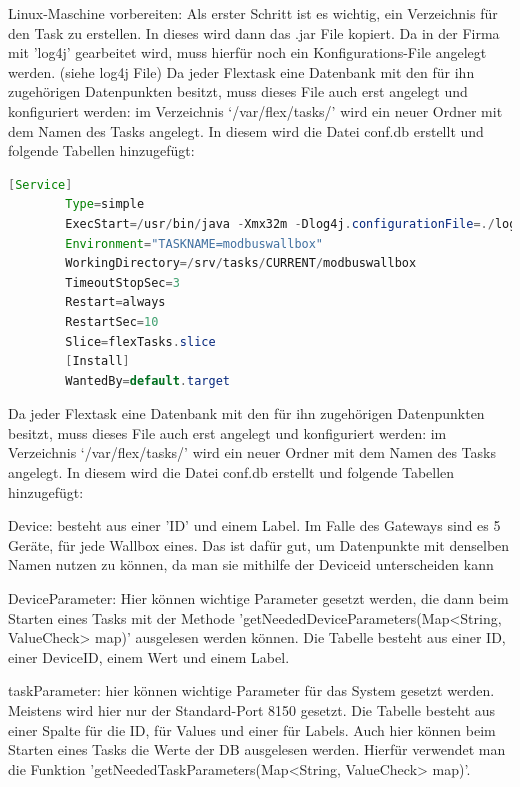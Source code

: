 \begin{compactenum}
    \item Linux-Maschine vorbereiten: Als erster Schritt ist es wichtig, ein Verzeichnis für den Task zu erstellen. In dieses wird dann das .jar File kopiert. Da in der Firma mit 'log4j' gearbeitet wird, muss hierfür noch ein Konfigurations-File angelegt werden. (siehe log4j File)
    Da jeder Flextask eine Datenbank mit den für ihn zugehörigen Datenpunkten besitzt, muss dieses File auch erst angelegt und konfiguriert werden: im Verzeichnis ‘/var/flex/tasks/’ wird ein neuer Ordner mit dem Namen des Tasks angelegt. In diesem wird die Datei conf.db erstellt und folgende Tabellen hinzugefügt:
    \begin{lstlisting}[language=java,caption=Log4J File,label=lst:impl:foo]
        [Service]
        Type=simple
        ExecStart=/usr/bin/java -Xmx32m -Dlog4j.configurationFile=./log4j2.xml -jar /srv/tasks/CURRENT/modbuswallbox/modbuswallbox.jar
        Environment="TASKNAME=modbuswallbox"
        WorkingDirectory=/srv/tasks/CURRENT/modbuswallbox
        TimeoutStopSec=3
        Restart=always
        RestartSec=10
        Slice=flexTasks.slice
        [Install]
        WantedBy=default.target
    \end{lstlisting}
    \item Da jeder Flextask eine Datenbank mit den für ihn zugehörigen Datenpunkten besitzt, muss dieses File auch erst angelegt und konfiguriert werden: im Verzeichnis ‘/var/flex/tasks/’ wird ein neuer Ordner mit dem Namen des Tasks angelegt. In diesem wird die Datei conf.db erstellt und folgende Tabellen hinzugefügt:
    \begin{compactenum}
        \item Device: besteht aus einer 'ID' und einem Label. Im Falle des Gateways sind es 5 Geräte, für jede Wallbox eines. Das ist dafür gut, um Datenpunkte mit denselben Namen nutzen zu können, da man sie mithilfe der Deviceid unterscheiden kann
        \item DeviceParameter: Hier können wichtige Parameter gesetzt werden, die dann beim Starten eines Tasks mit der Methode 'getNeededDeviceParameters(Map<String, ValueCheck> map)' ausgelesen werden können. Die Tabelle besteht aus einer ID, einer DeviceID, einem Wert und einem Label.
        \item taskParameter: hier können wichtige Parameter für das System gesetzt werden. Meistens wird hier nur der Standard-Port 8150 gesetzt. Die Tabelle besteht aus einer Spalte für die ID, für Values und einer für Labels. Auch hier können beim Starten eines Tasks die Werte der DB ausgelesen werden. Hierfür verwendet man die Funktion 'getNeededTaskParameters(Map<String, ValueCheck> map)'.

\end{compactenum}
\end{compactenum}
